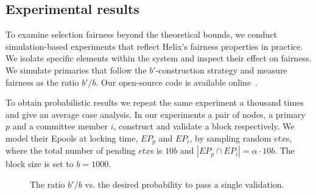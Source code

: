 \subsection{Experimental results}

To examine selection fairness beyond the theoretical bounds, we conduct simulation-based experiments that reflect Helix's fairness properties in practice. We isolate specific elements within the system and inspect their effect on fairness. We simulate primaries that follow the $b'$-construction strategy and measure fairness as the ratio $b'/b$.    
Our open-source code is available online~\cite{githubconsensus}.
   
To obtain probabilistic results we repeat the same experiment a thousand times and give an average case analysis. In our experiments a pair of nodes, a primary $p$ and a committee member $i$, construct and validate a block respectively. We model their Epools at locking time, $EP_p$ and $EP_i$, by sampling random $etx$s, where the total number of pending $etx$s is $10b$ and $|EP_p \cap EP_i|=\alpha \cdot10b$. The block size is set to $b=1000$.       

\begin{figure}[t!]
\caption{The ratio $b'/b$ vs. the desired probability to pass a single validation.}
 \label{fig_pr_vs_q}
\end{figure}

